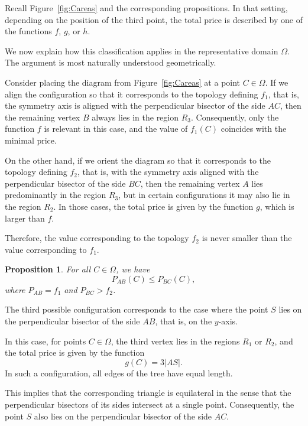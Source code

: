 \documentclass[openany]{book}
\newtheorem{proposition}{Proposition}
\begin{document}
	Recall Figure~\ref{fig:Careas} and the corresponding propositions. In that
	setting, depending on the position of the third point, the total price is
	described by one of the functions \(f\), \(g\), or \(h\).
	
	We now explain how this classification applies in the representative domain
	\(\Omega\). The argument is most naturally understood geometrically.
	
	Consider placing the diagram from Figure~\ref{fig:Careas} at a point
	\(C \in \Omega\). If we align the configuration so that it corresponds to
	the topology defining \(f_1\), that is, the symmetry axis is aligned with the
	perpendicular bisector of the side \(AC\), then the remaining vertex \(B\)
	always lies in the region \(R_3\). Consequently, only the function \(f\)
	is relevant in this case, and the value of \(f_1(C)\) coincides with the
	minimal price.
	
	On the other hand, if we orient the diagram so that it corresponds to the
	topology defining \(f_2\), that is, with the symmetry axis aligned with the
	perpendicular bisector of the side \(BC\), then the remaining vertex \(A\)
	lies predominantly in the region \(R_3\), but in certain configurations it
	may also lie in the region \(R_2\). In those cases, the total price is given
	by the function \(g\), which is larger than \(f\).
	
	Therefore, the value corresponding to the topology \(f_2\) is never smaller
	than the value corresponding to \(f_1\).
	\begin{proposition}\label{prop:PabPbc}
		For all \(C \in \Omega\), we have
		\[
		P_{AB}(C) \le P_{BC}(C),
		\]
		where \(P_{AB} = f_1\) and \(P_{BC} > f_2\).
	\end{proposition}

	The third possible configuration corresponds to the case where the point \(S\)
	lies on the perpendicular bisector of the side \(AB\), that is, on the
	\(y\)-axis.
	
	In this case, for points \(C \in \Omega\), the third vertex lies in the regions
	\(R_1\) or \(R_2\), and the total price is given by the function
	\[
	g(C) = 3|AS|.
	\]
	In such a configuration, all edges of the tree have equal length.
	
	This implies that the corresponding triangle is equilateral in the sense that
	the perpendicular bisectors of its sides intersect at a single point.
	Consequently, the point \(S\) also lies on the perpendicular bisector of the
	side \(AC\).
	
\end{document}

